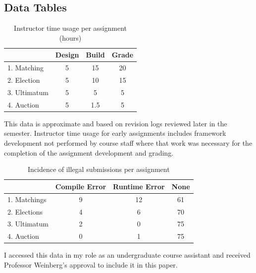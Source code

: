 \documentclass[pageno]{jpaper}
\begin{document}
\begin{appendices}
\newpage
\section{Data Tables}\label{appendix:tables}

\begin{table}[!h]
  \centering
  \begin{tabular}{l|c c c}  & Design& Build& Grade\\
    \hline
    1. Matching& 5& 15& 20\\
    2. Election& 5& 10& 15\\
    3. Ultimatum& 5& 5& 5\\
    4. Auction& 5& 1.5& 5
  \end{tabular}
  \caption{Instructor time usage per assignment (hours)}\label{table:time}
\end{table}
This data is approximate and based on revision logs reviewed later in the semester.
Instructor time usage for early assignments includes framework development not performed by course staff where that work was necessary for the completion of the assignment development and grading.

\begin{table}[!h]
  \centering
  \begin{tabular}{l|c c c} & Compile Error& Runtime Error& None\\
    \hline
    1. Matchings& 9& 12& 61\\
    2. Elections& 4& 6& 70\\
    3. Ultimatum& 2& 0& 75\\
    4. Auction& 0& 1& 75
  \end{tabular}
  \caption{Incidence of illegal submissions per assignment}\label{table:illegal}
\end{table}
I accessed this data in my role as an undergraduate course assistant and received Professor Weinberg's approval to include it in this paper.

\end{appendices}
\end{document}
